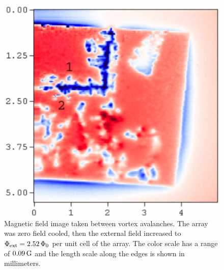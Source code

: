 \begin{figure}[p]
\includegraphics[width=5.7in]{figs/prospective/fig2_a_lg.ps}
\caption[Magnetic field images taken between vortex avalanches, at
$\Phiext = 2.52\,\Phinot$ per unit cell of the array.]
{Magnetic field image taken between vortex avalanches. The
array was zero field cooled, then the external field increased
to  $\Phiext = 2.52\,\Phinot$ per unit cell of the array. 
The color scale has a range of
$0.09\,\mathrm{G}$ and the length scale along the edges is shown in 
millimeters.
}
\label{fig:small_avalanche_steps_a}
\end{figure} 

